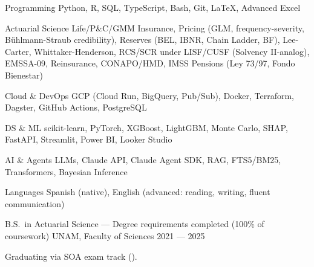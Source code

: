 \documentclass[10pt, letterpaper]{awesome-cv}
\begin{document}

\begin{cvskills}
  \cvskill
    {Programming}
    {Python, R, SQL, TypeScript, Bash, Git, \LaTeX, Advanced Excel}

  \cvskill
    {Actuarial Science}
    {Life/P\&C/GMM Insurance, Pricing (GLM, frequency-severity, Bühlmann-Straub credibility), Reserves (BEL, IBNR, Chain Ladder, BF), Lee-Carter, Whittaker-Henderson, RCS/SCR under LISF/CUSF (Solvency II-analog), EMSSA-09, Reinsurance, CONAPO/HMD, IMSS Pensions (Ley 73/97, Fondo Bienestar)}

  \cvskill
    {Cloud \& DevOps}
    {GCP (Cloud Run, BigQuery, Pub/Sub), Docker, Terraform, Dagster, GitHub Actions, PostgreSQL}

  \cvskill
    {DS \& ML}
    {scikit-learn, PyTorch, XGBoost, LightGBM, Monte Carlo, SHAP, FastAPI, Streamlit, Power BI, Looker Studio}

  \cvskill
    {AI \& Agents}
    {LLMs, Claude API, Claude Agent SDK, RAG, FTS5/BM25, Transformers, Bayesian Inference}

  \cvskill
    {Languages}
    {Spanish (native), English (advanced: reading, writing, fluent communication)}
\end{cvskills}


\begin{cventries}
  \cventry
    {B.S.\ in Actuarial Science — Degree requirements completed (100\% of coursework)}
    {UNAM, Faculty of Sciences}
    {}
    {2021 — 2025}
    {
      \begin{cvitems}
        \item {Graduating via SOA exam track ().}
      \end{cvitems}
    }
\end{cventries}

\end{document}
